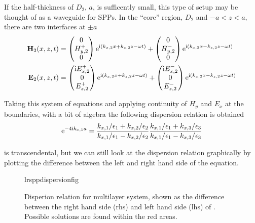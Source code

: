 If the half-thickness of $D_2$, $a$, is sufficently small, this type of setup may be thought of as a
waveguide for SPPs.  In the ``core'' region, $D_2$ and $-a<z<a$,
there are two interfaces at $\pm a$
\begin{align}
\mathbf{H}_2(x,z,t) &=
\begin{pmatrix}
0\\
H^+_{y,2}\\
0
\end{pmatrix} {\mathrm{e}}^{{\mathrm{i}}(k_{x,2}x+k_{z,2}z-\omega t)}
+
\begin{pmatrix}
0\\
H^-_{y,2}\\
0
\end{pmatrix} {\mathrm{e}}^{{\mathrm{i}}(k_{x,2}x-k_{z,2}z-\omega t)} \\
\mathbf{E}_2(x,z,t) &=
\begin{pmatrix}
{\mathrm{i}} E^+_{x,2}\\
0\\
E^+_{z,2}\\
\end{pmatrix} {\mathrm{e}}^{{\mathrm{i}}(k_{x,2}x+k_{z,2}z-\omega t)}
+
\begin{pmatrix}
{\mathrm{i}} E^-_{x,2}\\
0\\
E^-_{z,2}\\
\end{pmatrix} {\mathrm{e}}^{{\mathrm{i}}(k_{x,2}x-k_{z,2}z-\omega t)}
\end{align}

Taking this system of equations and applying continuity of $H_y$ and $E_x$
at the boundaries, with a bit of algebra the following dispersion relation
is obtained
\begin{equation}
{\mathrm{e}}^{-4 {\mathrm{i}} k_{x,1} a} = 
\frac{k_{x,1}/\epsilon_1 + k_{x,2}/\epsilon_2}
     {k_{x,1}/\epsilon_1 - k_{x,2}/\epsilon_2}
\frac{k_{x,1}/\epsilon_1 + k_{x,3}/\epsilon_3}
     {k_{x,1}/\epsilon_1 - k_{x,3}/\epsilon_3}
\label{eqn:lrsppdispersion}
\end{equation}

 is transcendental, but we can still look at
the dispersion relation graphically by plotting the difference between the
left and right hand side of the equation.

\begin{figure}[ht]
 \centering
{lrsppdispersionfig}
\label{fig:lrsppdispersionrelation}
\caption{Disperion relation for multilayer system, shown as the difference
 between the right hand side (rhs) and left hand side (lhs) of
.  Possible solutions are found within the
red areas.}
\end{figure}

